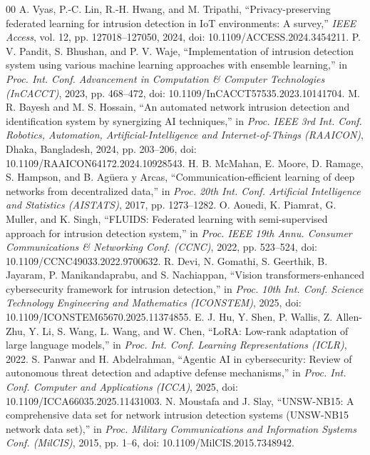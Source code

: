 \begin{thebibliography}{00}
 A. Vyas, P.-C. Lin, R.-H. Hwang, and M. Tripathi, ``Privacy-preserving federated learning for intrusion detection in IoT environments: A survey,'' \textit{IEEE Access}, vol. 12, pp. 127018--127050, 2024, doi: 10.1109/ACCESS.2024.3454211.
 P. V. Pandit, S. Bhushan, and P. V. Waje, ``Implementation of intrusion detection system using various machine learning approaches with ensemble learning,'' in \textit{Proc. Int. Conf. Advancement in Computation \& Computer Technologies (InCACCT)}, 2023, pp. 468--472, doi: 10.1109/InCACCT57535.2023.10141704.
 M. R. Bayesh and M. S. Hossain, ``An automated network intrusion detection and identification system by synergizing AI techniques,'' in \textit{Proc. IEEE 3rd Int. Conf. Robotics, Automation, Artificial-Intelligence and Internet-of-Things (RAAICON)}, Dhaka, Bangladesh, 2024, pp. 203--206, doi: 10.1109/RAAICON64172.2024.10928543.
 H. B. McMahan, E. Moore, D. Ramage, S. Hampson, and B. Ag\"{u}era y Arcas, ``Communication-efficient learning of deep networks from decentralized data,'' in \textit{Proc. 20th Int. Conf. Artificial Intelligence and Statistics (AISTATS)}, 2017, pp. 1273--1282.
 O. Aouedi, K. Piamrat, G. Muller, and K. Singh, ``FLUIDS: Federated learning with semi-supervised approach for intrusion detection system,'' in \textit{Proc. IEEE 19th Annu. Consumer Communications \& Networking Conf. (CCNC)}, 2022, pp. 523--524, doi: 10.1109/CCNC49033.2022.9700632.
 R. Devi, N. Gomathi, S. Geerthik, B. Jayaram, P. Manikandaprabu, and S. Nachiappan, ``Vision transformers-enhanced cybersecurity framework for intrusion detection,'' in \textit{Proc. 10th Int. Conf. Science Technology Engineering and Mathematics (ICONSTEM)}, 2025, doi: 10.1109/ICONSTEM65670.2025.11374855.
 E. J. Hu, Y. Shen, P. Wallis, Z. Allen-Zhu, Y. Li, S. Wang, L. Wang, and W. Chen, ``LoRA: Low-rank adaptation of large language models,'' in \textit{Proc. Int. Conf. Learning Representations (ICLR)}, 2022.
 S. Panwar and H. Abdelrahman, ``Agentic AI in cybersecurity: Review of autonomous threat detection and adaptive defense mechanisms,'' in \textit{Proc. Int. Conf. Computer and Applications (ICCA)}, 2025, doi: 10.1109/ICCA66035.2025.11431003.
 N. Moustafa and J. Slay, ``UNSW-NB15: A comprehensive data set for network intrusion detection systems (UNSW-NB15 network data set),'' in \textit{Proc. Military Communications and Information Systems Conf. (MilCIS)}, 2015, pp. 1--6, doi: 10.1109/MilCIS.2015.7348942.

\end{thebibliography}
